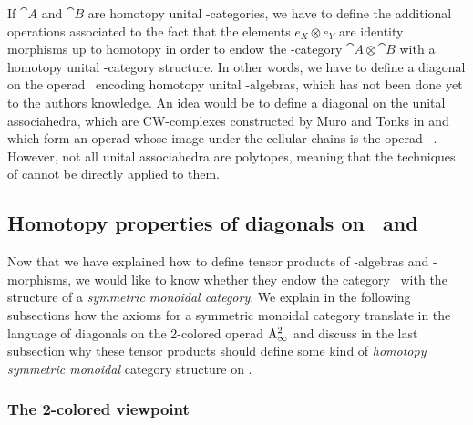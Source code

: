 \documentclass[twoside, 12pt]{amsart}
\theoremstyle{remark}
\begin{document}
If $\cat{A}$ and $\cat{B}$ are homotopy unital \Ainf -categories, we have to define the additional operations associated to the fact that the elements $e_X \otimes e_Y$ are identity morphisms up to homotopy in order to endow the \Ainf -category $\cat{A} \otimes \cat{B}$ with a homotopy unital \Ainf -category structure. In other words, we have to define a diagonal on the operad \uAinf\ encoding homotopy unital \Ainf -algebras, which has not been done yet to the authors knowledge. An idea would be to define a diagonal on the unital associahedra, which are CW-complexes constructed by Muro and Tonks in \cite{MuroTonks} and which form an operad whose image under the cellular chains is the operad \uAinf\ . However, not all unital associahedra are polytopes, meaning that the techniques of \cite{MTTV19} cannot be directly applied to them. 

\subsection{Homotopy properties of diagonals on \Ainf\ and \Minf}


Now that we have explained how to define tensor products of \Ainf -algebras and \Ainf -morphisms, we would like to know whether they endow the category \Aalg\ with the structure of a \textit{symmetric monoidal category}. We explain in the following subsections how the axioms for a symmetric monoidal category translate in the language of diagonals on the 2-colored operad $\mathrm{A}_\infty^2$ and discuss in the last subsection why these tensor products should define some kind of \textit{homotopy symmetric monoidal} category structure on \Aalg .

\subsubsection{The 2-colored viewpoint}
\end{document}
